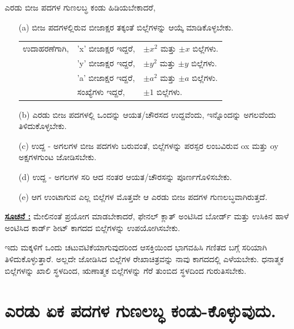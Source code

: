 ಎರಡು ಬೀಜ ಪದಗಳ ಗುಣಲಬ್ಧ ಕಂಡು ಹಿಡಿಯಬೇಕಾದರೆ,
\smallskip
\smallskip
\begin{itemize}
\item [(a)] ಬೀಜ ಪದಗಳಲ್ಲಿರುವ ಬೀಜಾಕ್ಷರ ತಕ್ಕಂತೆ ಬಿಲ್ಲೆಗಳನ್ನು ಆಯ್ಕೆ ಮಾಡಿಕೊಳ್ಳಬೇಕು.

\smallskip

\begin{tabular}{lll}
ಉದಾಹರಣೆಗಾಗಿ, & 'x' ಬೀಜಾಕ್ಷರ ಇದ್ದರೆ, & $\pm x^2$ ಮತ್ತು $\pm x$ ಬಿಲ್ಲೆಗಳು.\\[0.1cm]
& 'y' ಬೀಜಾಕ್ಷರ ಇದ್ದರೆ, & $\pm y^2$ ಮತ್ತು $\pm y$ ಬಿಲ್ಲೆಗಳು.\\[0.1cm]
& 'a' ಬೀಜಾಕ್ಷರ ಇದ್ದರೆ, & $\pm a^2$ ಮತ್ತು $\pm a$ ಬಿಲ್ಲೆಗಳು.\\[0.1cm]
& ಸಂಖ್ಯೆಗಳು ಇದ್ದರೆ, & $\pm 1$ ಬಿಲ್ಲೆಗಳು.  
\end{tabular}

\medskip

\item [(b)] ಎರಡು ಬೀಜ ಪದಗಳಲ್ಲಿ ಒಂದನ್ನು ಆಯತ/ಚೌರಸದ ಉದ್ದವೆಂದು, ಇನ್ನೊಂದನ್ನು ಅಗಲವೆಂದು ತಿಳಿದುಕೊಳ್ಳಬೇಕು. 

\medskip

\item [(c)] ಉದ್ದ - ಅಗಲಗಳ ಬೀಜ ಪದಗಳು ಬರುವಂತೆ, ಬಿಲ್ಲೆಗಳನ್ನು ಪರಸ್ಪರ ಲಂಬವಿರುವ ox ಮತ್ತು oy ಅಕ್ಷಗಳಗುಂಟ ಜೋಡಿಸಬೇಕು. 

\medskip

\item [(d)] ಉದ್ದ - ಅಗಲಗಳ ಸರಿ ಆದ ನಂತರ ಆಯತ/ಚೌರಸನ್ನು ಪೂರ್ಣಗೊಳಿಸಬೇಕು. 

\medskip

\item [(e)] ಆಗ ಉಂಟಾಗುವ ಎಲ್ಲ ಬಿಲ್ಲೆಗಳ ಮೊತ್ತವೇ ಆ ಎರಡು ಬೀಜ ಪದಗಳ ಗುಣಲಬ್ಧ\break ವಾಗಿರುತ್ತದೆ.
\end{itemize}

\medskip
\noindent
{\textbf{\underline{ಸೂಚನೆ :}}} ಮೇಲಿನಂತೆ ಪ್ರಯೋಗ ಮಾಡಬೇಕಾದರೆ, ಫೇನಲ್ ಕ್ಲಾತ್ ಅಂಟಿಸಿದ ಬೋರ್ಡ್ ಮತ್ತು ಉಸಿಕಿನ ಹಾಳೆ ಅಂಟಿಸಿದ ಕಾರ್ಡ್ ಶೀಟ್ ಕಾಗದದ ಬಿಲ್ಲೆಗಳನ್ನು ಉಪಯೋಗಿಸ\-ಬೇಕು. 

\smallskip

ಇದು ಮಕ್ಕಳಿಗೆ ಒಂದು ಚಟುವಟಿಕೆಯಾಗುವುದರಿಂದ ಆಸಕ್ತಿಯಿಂದ ಭಾಗವಹಿಸಿ ಗಣಿತದ ಬಗ್ಗೆ ಸರಿಯಾಗಿ ತಿಳಿದುಕೊಳ್ಳುತ್ತಾರೆ. ಅಲ್ಲದೇ ಜೋಡಿಸಿದ ಬಿಲ್ಲೆಗಳ ರೇಖಾಚಿತ್ರ\break ವನ್ನು ನಾವು ಕಾಗದದಲ್ಲಿ ಎಳೆಯಬೇಕು. ಧನಾತ್ಮಕ ಬಿಲ್ಲೆಗಳನ್ನು ಖಾಲಿ ಸ್ಥಳದಿಂದ, ಋಣಾತ್ಮಕ ಬಿಲ್ಲೆಗಳನ್ನು ಗೆರೆ ತುಂಬಿದ ಸ್ಥಳದಿಂದ ಗುರುತಿಸಬೇಕು.

\section*{ಎರಡು ಏಕ ಪದಗಳ ಗುಣಲಬ್ಧ ಕಂಡು-ಕೊಳ್ಳುವುದು.}

